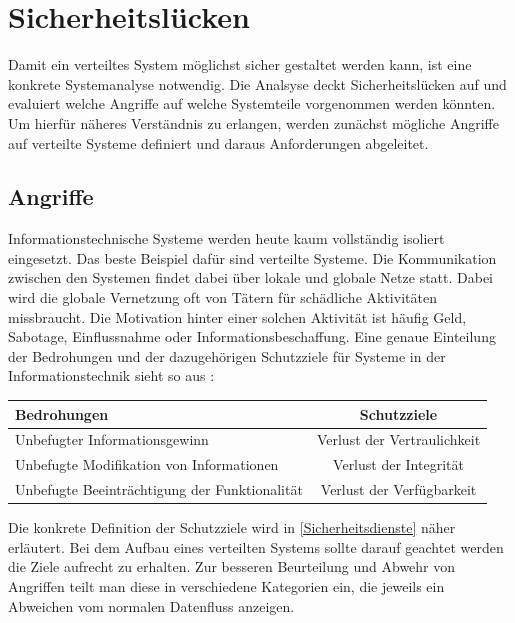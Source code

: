 \documentclass[utf8,biblatex]{lni}
\begin{document}
\section{Sicherheitslücken}\label{Sicherheitsluecken}
Damit ein verteiltes System möglichst sicher gestaltet werden kann, ist eine konkrete Systemanalyse notwendig. Die Analsyse deckt Sicherheitslücken auf und evaluiert welche Angriffe auf welche Systemteile vorgenommen
werden könnten. Um hierfür näheres Verständnis zu erlangen, werden zunächst mögliche Angriffe auf verteilte Systeme definiert und daraus Anforderungen abgeleitet.

\subsection{Angriffe}

Informationstechnische Systeme werden heute kaum vollständig isoliert eingesetzt. Das beste Beispiel
dafür sind verteilte Systeme. Die Kommunikation zwischen den Systemen findet dabei über lokale und globale 
Netze statt. Dabei wird die globale Vernetzung oft von Tätern für schädliche Aktivitäten missbraucht.
Die Motivation hinter einer solchen Aktivität ist häufig Geld, Sabotage, Einflussnahme oder Informationsbeschaffung. 
Eine genaue Einteilung der Bedrohungen und der dazugehörigen Schutzziele für Systeme in der Informationstechnik sieht so aus \cite{Bedner.2010}:

\begin{tabular}[h]{l|c}
    Bedrohungen & Schutzziele \\
    \hline
    Unbefugter Informationsgewinn & Verlust der Vertraulichkeit \\
    Unbefugte Modifikation von Informationen & Verlust der Integrität \\
    Unbefugte Beeinträchtigung der Funktionalität & Verlust der Verfügbarkeit \\
\end{tabular}

Die konkrete Definition der Schutzziele wird in \autoref{Sicherheitsdienste} näher erläutert.
Bei dem Aufbau eines verteilten Systems sollte darauf geachtet werden die Ziele 
aufrecht zu erhalten. 
Zur besseren Beurteilung und Abwehr von Angriffen teilt man diese in verschiedene Kategorien ein,
die jeweils ein Abweichen vom normalen Datenfluss anzeigen.
\end{document}
